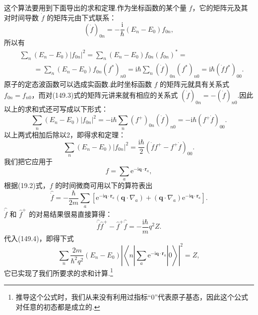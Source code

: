 这个算法要用到下面导出的求和定理.作为坐标函数的某个量 $f$，它的矩阵元及其对时间导数 $\dot{f}$ 的矩阵元由下式联系：
\begin{equation}
  \left(\dot{f}\right)_{0n}=-\frac{\mathrm{i}}{\hbar}\left(E_n-E_0\right)f_{0n},
\end{equation}
所以有
\begin{equation*}
\begin{aligned}
  &\sum_n\left(E_n-E_0\right)|f_{0n}|^2
  =\sum_n\left(E_n-E_0\right)f_{0n}(f_{0n})^{*}=\\
  &\qquad=\sum_n\left(E_n-E_0\right)f_{0n}(f^{*})_{n0}
  =\mathrm{i}\hbar\sum_n(\dot{f})_{0n}(f^{*})_{n0}
  =\mathrm{i}\hbar(\dot{f}f^{*})_{00}.
\end{aligned}
\end{equation*}
原子的定态波函数可以选成实函数.此时坐标函数 $f$ 的矩阵元就具有关系式 $f_{0n}=f_{n0}$，而对(149.3)式的矩阵元讲来就有相应的关系式 $(\dot{f})_{0n}=-(\dot{f})_{n0}$.因此以上的求和式还可写成以下形式：
\begin{equation*}
  \sum_n\left(E_n-E_0\right)|f_{0n}|^2
  =-\mathrm{i}\hbar\sum_n(f^{+})_{0n}(\dot{f})_{n0}
  =-\mathrm{i}\hbar(f^{+}\dot{f})_{00}.
\end{equation*}
以上两式相加后除以2，即得求和定理：
\begin{equation}
  \sum_n\left(E_n-E_0\right)|f_{0n}|^2
  =\frac{\mathrm{i}\hbar}{2}\left(\dot{f}f^{+}-f^{+}\dot{f}\right)_{00}.
\end{equation}
我们把它应用于
\begin{equation*}
  f=\sum_a\mathrm{e}^{-\mathrm{i}\boldsymbol{q}\cdot\boldsymbol{r}_a},
\end{equation*}
根据(19.2)式，$f$ 的时间微商可用以下的算符表出
\begin{equation*}
  \hat{\dot{f}}=-\frac{\hbar}{2m}\sum_a
  \left[\mathrm{e}^{-\mathrm{i}\boldsymbol{q}\cdot\boldsymbol{r}_a}(\boldsymbol{q}\cdot\nabla_a)
  +(\boldsymbol{q}\cdot\nabla_a)\mathrm{e}^{-\mathrm{i}\boldsymbol{q}\cdot\boldsymbol{r}_a}\right].
\end{equation*}
$\hat{\dot{f}}$ 和 $\hat{f}^{+}$ 的对易结果很易直接算得：
\begin{equation*}
  \hat{\dot{f}}\hat{f}^{+}-\hat{f}^{+}\hat{\dot{f}}=-\frac{\mathrm{i}\hbar}{m}q^2Z.
\end{equation*}
代入(149.4)，即得下式
\begin{equation}
  \sum_n\frac{2m}{\hbar^2q^2}\left(E_n-E_0\right)
  \left|\left\langle n\left|\sum_a\mathrm{e}^{-\mathrm{i}\boldsymbol{q}\cdot\boldsymbol{r}_a}\right|0\right\rangle\right|^2
  =Z,
\end{equation}
它已实现了我们所要求的求和计算.\footnote{推导这个公式时，我们从来没有利用过指标“0”代表原子基态，因此这个公式对任意的初态都是成立的.}

